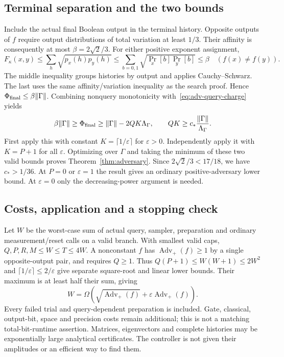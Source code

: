 \documentclass[11pt]{article}
\theoremstyle{remark}
\newcommand{\eps}{\varepsilon}
\begin{document}
\subsection{Terminal separation and the two bounds}
Include the actual final Boolean output in the terminal history. Opposite
outputs of $f$ require output distributions of total variation at least
$1/3$. Their affinity is consequently at most $\beta=2\sqrt2/3$.
For either positive exponent assignment,
\[
 F_\kappa(x,y)\le\sum_h\sqrt{p_x(h)p_y(h)}
 \le\sum_{b=0,1}\sqrt{\Pr_x[b]\Pr_y[b]}\le\beta
 \quad(f(x)\ne f(y)).
\]
The middle inequality groups histories by output and applies
Cauchy--Schwarz. The last uses the same affinity/variation inequality as
the search proof. Hence $\Phi_{\rm final}\le\beta\|\Gamma\|$.
Combining nonquery monotonicity with~\eqref{eq:adv-query-charge} yields
\[
 \beta\|\Gamma\|\ge\Phi_{\rm final}
 \ge\|\Gamma\|-2QK\Lambda_\Gamma,
 \qquad QK\ge c_*\frac{\|\Gamma\|}{\Lambda_\Gamma}.
\]
First apply this with constant $K=\lceil1/\eps\rceil$ for $\eps>0$.
Independently apply it with $K=P+1$ for all $\eps$. Optimizing over
$\Gamma$ and taking the minimum of these two valid bounds proves
Theorem~\ref{thm:adversary}. Since $2\sqrt2/3<17/18$, we have $c_*>1/36$.
At $P=0$ or $\eps=1$ the result gives an ordinary positive-adversary lower
bound. At $\eps=0$ only the decreasing-power argument is needed.

\subsection{Costs, application and a stopping check}
Let $W$ be the worst-case sum of actual query, sampler, preparation and
ordinary measurement/reset calls on a valid branch. With smallest valid
caps, $Q,P,R,M\le W\le T\le4W$. A nonconstant $f$ has
$\operatorname{Adv}_{+}(f)\ge1$ by a single opposite-output pair, and
requires $Q\ge1$. Thus $Q(P+1)\le W(W+1)\le2W^2$ and
$\lceil1/\eps\rceil\le2/\eps$ give separate square-root and
linear lower bounds. Their maximum is at least half their sum, giving
\begin{equation}\label{eq:adv-total}
 W=\Omega\!\left(\sqrt{\operatorname{Adv}_{+}(f)}
                  +\eps\operatorname{Adv}_{+}(f)\right).
\end{equation}
Every failed trial and query-dependent preparation is included. Gate,
classical, output-bit, space and precision costs remain additional; this
is not a matching total-bit-runtime assertion. Matrices, eigenvectors and
complete histories may be exponentially large analytical certificates.
The controller is not given their amplitudes or an efficient way to find them.
\end{document}
